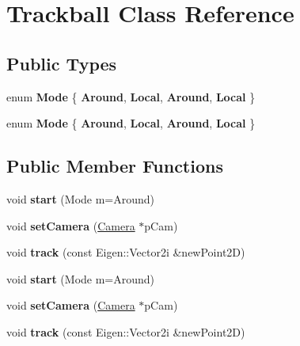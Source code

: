 \hypertarget{class_trackball}{}\section{Trackball Class Reference}
\label{class_trackball}
\subsection*{Public Types}
\begin{DoxyCompactItemize}
\item 
\mbox{\label{class_trackball_ab221a0af65769c8e5be823ea63a8b813}} 
enum {\bfseries Mode} \{ {\bfseries Around}, 
{\bfseries Local}, 
{\bfseries Around}, 
{\bfseries Local}
 \}
\item 
\mbox{\label{class_trackball_ab221a0af65769c8e5be823ea63a8b813}} 
enum {\bfseries Mode} \{ {\bfseries Around}, 
{\bfseries Local}, 
{\bfseries Around}, 
{\bfseries Local}
 \}
\end{DoxyCompactItemize}
\subsection*{Public Member Functions}
\begin{DoxyCompactItemize}
\item 
\mbox{\label{class_trackball_acd3abf8a7db62e0c83ba562682b37558}} 
void {\bfseries start} (Mode m=Around)
\item 
\mbox{\label{class_trackball_a79b2ec60df4531f9efb9d931817fd864}} 
void {\bfseries set\+Camera} (\hyperlink{class_camera}{Camera} $\ast$p\+Cam)
\item 
\mbox{\label{class_trackball_a25a5be033630b6ed3209ff6388887b1a}} 
void {\bfseries track} (const Eigen\+::\+Vector2i \&new\+Point2D)
\item 
\mbox{\label{class_trackball_acd3abf8a7db62e0c83ba562682b37558}} 
void {\bfseries start} (Mode m=Around)
\item 
\mbox{\label{class_trackball_a79b2ec60df4531f9efb9d931817fd864}} 
void {\bfseries set\+Camera} (\hyperlink{class_camera}{Camera} $\ast$p\+Cam)
\item 
\mbox{\label{class_trackball_a25a5be033630b6ed3209ff6388887b1a}} 
void {\bfseries track} (const Eigen\+::\+Vector2i \&new\+Point2D)
\end{DoxyCompactItemize}
